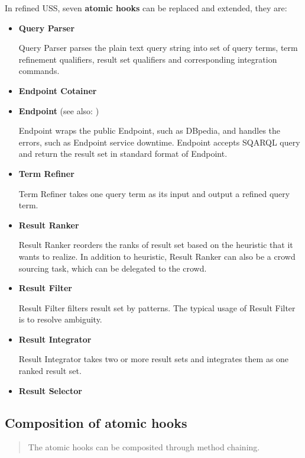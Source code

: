 \documentclass[letterpaper,10pt,english]{sphinxmanual}
\begin{document}
In refined USS, seven \textbf{atomic hooks} can be replaced and extended, they are:
\begin{itemize}
\item {} 
\textbf{Query Parser}

Query Parser parses the plain text query string into set of query terms, term refinement qualifiers, result set qualifiers and corresponding integration commands.

\item {} 
\textbf{Endpoint Cotainer}

\end{itemize}
\label{docs/uss:endpoint}\begin{itemize}
\item {} 
\textbf{Endpoint} (see also: {\hyperref[docs/api:Endpoint]{}})

Endpoint wraps the public Endpoint, such as DBpedia, and handles the errors, such as Endpoint service downtime. Endpoint accepts SQARQL query and return the result set in standard format of Endpoint.

\item {} 
\textbf{Term Refiner}

Term Refiner takes one query term as its input and output a refined query term.

\item {} 
\textbf{Result Ranker}

Result Ranker reorders the ranks of result set based on the heuristic that it wants to realize. In addition to heuristic, Result Ranker can also be a crowd sourcing task, which can be delegated to the crowd.

\item {} 
\textbf{Result Filter}

Result Filter filters result set by patterns. The typical usage of Result Filter is to resolve ambiguity.

\end{itemize}
\begin{itemize}
\item {} 
\textbf{Result Integrator}

Result Integrator takes two or more result sets and integrates them as one ranked result set.

\item {} 
\textbf{Result Selector}

\end{itemize}


\subsection{Composition of atomic hooks}
\label{docs/uss:composition-of-atomic-hooks}\begin{quote}

The atomic hooks can be composited through method chaining.
\end{quote}
\end{document}

